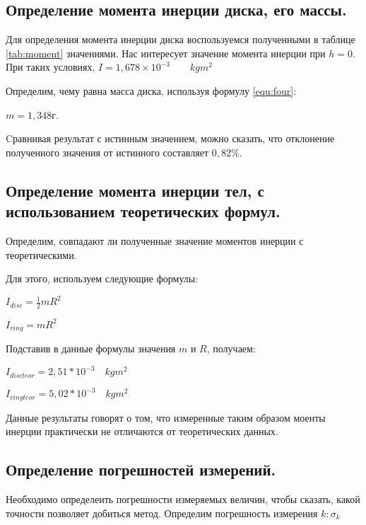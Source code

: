 \documentclass[12pt,a4paper]{article}
\begin{document}
		\newpage

	\subsection{Определение момента инерции диска, его массы.}


		Для определения момента инерции диска воспользуемся полученными в таблице \ref{tab:moment} значениями. Нас  интересует значение момента инерции при $ h = 0$. При таких условиях, $ I = 1,678 \times 10^{-3} \qquad kgm^2 $

		Определим, чему равна масса диска, используя формулу \ref{equ:four}:

		$ m = 1,348$г.

		Cравнивая результат с истинным значением, можно сказать, что отклонение полученного значения от истинного составляет $ 0,82 \% $.

	\subsection{Определение момента инерции тел, с использованием теоретических формул.}
		Определим, совпадают ли полученные значение моментов инерции с теоретическими.

		Для этого, используем следующие формулы:

		\newpage

		\begin{flushleft}
			\begin{spacing}{1.6}
				$ I_{disc} = \frac{1}{2}mR^2 $

				$ I_{ring} = mR^2 $
			\end{spacing}
		\end{flushleft}

		Подставив в данные формулы значения $ m $ и $ R $, получаем:

		\begin{flushleft}
			\begin{spacing}{1.6}
				$ I_{disc teor} =  2,51 * 10^{-3} \quad kgm^2 $

				$ I_{ring teor} = 5,02 * 10^{-3} \quad kgm^2 $
			\end{spacing}
		\end{flushleft}


		Данные результаты говорят о том, что измеренные таким образом моенты инерции практически не отличаются от теоретических данных.
	\subsection{Определение погрешностей измерений.}
		Необходимо определеить погрешности измеряемых величин, чтобы сказать, какой точности позволяет добиться метод.
		Определим погрешность измерения $k : \sigma_{k}$
\end{document}
